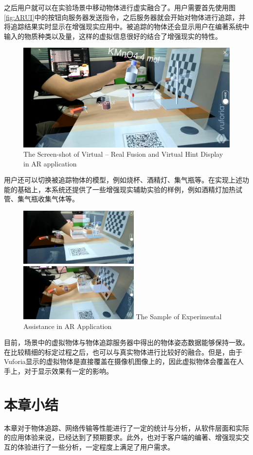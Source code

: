 之后用户就可以在实验场景中移动物体进行虚实融合了。用户需要首先使用图\ref{fig:ARUI}中的按钮向服务器发送指令，之后服务器就会开始对物体进行追踪，并将追踪结果实时显示在增强现实应用中。被追踪的物体还会显示用户在编著系统中输入的物质种类以及量，这样的虚拟信息很好的结合了增强现实的特性。

\begin{figure}[!htp]
  \centering
  \includegraphics[width=12cm]{figure/moving.jpg}
    {The Screen-shot of Virtual – Real Fusion and Virtual Hint Display in AR application }
 \label{fig:mAR}
\end{figure}

用户还可以切换被追踪物体的模型，例如烧杯、酒精灯、集气瓶等。在实现上述功能的基础上，本系统还提供了一些增强现实辅助实验的样例，例如酒精灯加热试管、集气瓶收集气体等。

\begin{figure}[!htp]
  \centering
  \includegraphics[width=6cm]{figure/heating.jpg}
    \hspace{1cm}
  \includegraphics[width=6cm]{figure/gatheringGas.jpg}
    {The Sample of Experimental Assistance in AR Application}
 \label{fig:comp}
\end{figure}

目前，场景中的虚拟物体与物体追踪服务器中得出的物体姿态数据能够保持一致。在比较精细的标定过程之后，也可以与真实物体进行比较好的融合。但是，由于Vuforia显示的虚拟物体是直接覆盖在摄像机图像上的，因此虚拟物体会覆盖在人手上，对于显示效果有一定的影响。

\section{本章小结}
本章对于物体追踪、网络传输等性能进行了一定的统计与分析，从软件层面和实际的应用体验来说，已经达到了预期要求。此外，也对于客户端的编著、增强现实交互的体验进行了一些分析，一定程度上满足了用户需求。